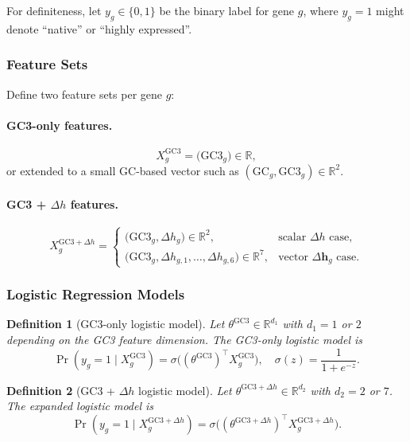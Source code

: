 \documentclass[11pt]{article}
\newtheorem{definition}{Definition}[section]
\newcommand{\R}{\mathbb{R}}
\newcommand{\vect}[1]{\bm{#1}}
\begin{document}
For definiteness, let \(y_g \in \{0,1\}\) be the binary label for gene \(g\), where \(y_g = 1\) might denote ``native'' or ``highly expressed''.

\subsubsection{Feature Sets}

Define two feature sets per gene \(g\):

\paragraph{GC3-only features.}
\[
  X_g^{\mathrm{GC3}} = \bigl(\mathrm{GC3}_g\bigr) \in \R,
\]
or extended to a small GC-based vector such as \((\mathrm{GC}_g, \mathrm{GC3}_g) \in \R^2\).

\paragraph{GC3 + \(\Delta h\) features.}
\[
  X_g^{\mathrm{GC3}+\Delta h} =
  \begin{cases}
    \bigl(\mathrm{GC3}_g, \Delta h_g\bigr) \in \R^2, & \text{scalar \(\Delta h\) case},\\[0.5em]
    \bigl(\mathrm{GC3}_g, \Delta h_{g,1}, \dots, \Delta h_{g,6}\bigr) \in \R^7, & \text{vector \(\Delta \vect{h}_g\) case}.
  \end{cases}
\]

\subsubsection{Logistic Regression Models}

\begin{definition}[GC3-only logistic model]
Let \(\theta^{\mathrm{GC3}} \in \R^{d_1}\) with \(d_1 = 1\) or \(2\) depending on the GC3 feature dimension.
The GC3-only logistic model is
\[
  \Pr(y_g = 1 \mid X_g^{\mathrm{GC3}}) =
  \sigma\bigl((\theta^{\mathrm{GC3}})^\top X_g^{\mathrm{GC3}}\bigr),
  \quad \sigma(z) = \frac{1}{1+e^{-z}}.
\]
\end{definition}

\begin{definition}[GC3 + \(\Delta h\) logistic model]
Let \(\theta^{\mathrm{GC3}+\Delta h} \in \R^{d_2}\) with \(d_2 = 2\) or \(7\).
The expanded logistic model is
\[
  \Pr(y_g = 1 \mid X_g^{\mathrm{GC3}+\Delta h}) =
  \sigma\bigl((\theta^{\mathrm{GC3}+\Delta h})^\top X_g^{\mathrm{GC3}+\Delta h}\bigr).
\]
\end{definition}
\end{document}
